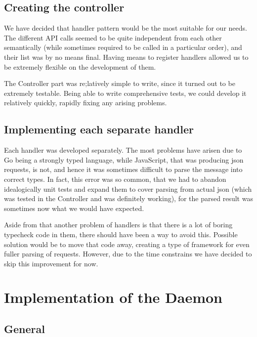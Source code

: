 \documentclass{l3proj}
\begin{document}
\subsection{Creating the controller}

We have decided that handler pattern would be the most suitable for our needs. The different API calls seemed to be quite independent from each other semantically (while sometimes required to be called in a particular order), and their list was by no means final. Having means to register handlers allowed us to be extremely flexible on the development of them.

The Controller part was re;latively simple to write, since it turned out to be extremely testable. Being able to write comprehensive tests, we could develop it relatively quickly, rapidly fixing any arising problems. 

\subsection{Implementing each separate handler}

Each handler was developed separately. The most problems have arisen due to Go being a strongly typed language, while JavaScript, that was producing json requests, is not, and hence it was sometimes difficult to parse the message into correct types. In fact, this error was so common, that we had to abandon idealogically unit tests and expand them to cover parsing from actual json (which was tested in the Controller and was definitely working), for the parsed result was sometimes now what we would have expected.

Aside from that another problem of handlers is that there is a lot of boring typecheck code in them, there should have been a way to avoid this. Possible solution would be to move that code away, creating a type of framework for even fuller parsing of requests. However, due to the time constrains we have decided to skip this improvement for now.


\section{Implementation of the Daemon}

\subsection{General}
\end{document}
